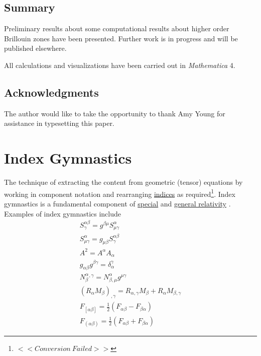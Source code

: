 \documentclass{article}
\begin{document}
\subsection{Summary}

\noindent Preliminary results about some computational results about
higher order Brillouin zones have been presented. Further work is
in progress and will be published elsewhere.

All calculations and visualizations have been carried out in \textit{Mathematica}
4. 
\subsection{Acknowledgments}

The author would like to take the opportunity to thank Amy Young
for assistance in typesetting this paper.

\appendix

\section{Index Gymnastics}

\noindent The technique of extracting the content from geometric
(tensor) equations by working in component notation and rearranging
\href{http://mathworld.wolfram.com/Index.html}{indices} as required\footnote{$
<<Conversion\ Failed>>%
 $}. Index gymnastics is a fundamental component of \href{http://scienceworld.wolfram.com/physics/SpecialRelativity.html}{special}
and \href{http://scienceworld.wolfram.com/physics/GeneralRelativity.html}{general
relativity} \cite{Misner}. Examples of index gymnastics include
\begin{gather*}
S^{\alpha \beta }_{\gamma }=g^{\beta \mu }S^{\alpha }_{\mu \gamma
}
\\S^{\alpha }_{\mu \gamma }=g_{\mu \beta }S^{\alpha \beta }_{\gamma
}
\\A^{2}=A^{\alpha }A_{\alpha }
\\g_{\alpha \beta }g^{\beta \gamma }=\delta _{\alpha }^{\gamma }
\\N^{\alpha }_{\beta }^{,\gamma }=N^{\alpha }_{\beta ,\mu }g^{\mu
\gamma }
\\\left( R_{\alpha }M_{\beta }\right) _{,\gamma }=R_{\alpha ,\gamma
}M_{\beta }+R_{\alpha }M_{\beta ,\gamma }
\\F_{\left[ \alpha \beta \right] }=\frac{1}{2}\left( F_{\alpha \beta
}-F_{\beta \alpha }\right) 
\\F_{\left( \alpha \beta \right) }=\frac{1}{2}\left( F_{\alpha \beta
}+F_{\beta \alpha }\right) 
\end{gather*}
\end{document}
